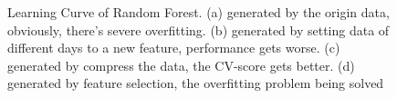 \documentclass[conference]{IEEEtran}
\begin{document}
\begin{figure}[!htb]
  \centering
{}
\hfill
{}
\caption{Learning Curve of Random Forest. (a) generated by the origin data, obviously, there's severe overfitting. (b) generated by setting data of different days to a new feature, performance gets worse. (c) generated by compress the data, the CV-score gets better. (d) generated by feature selection, the overfitting problem being solved}
\end{figure}
\end{document}
